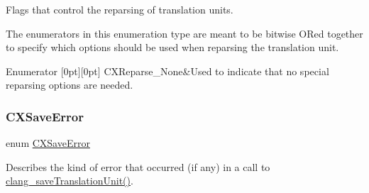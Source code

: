 Flags that control the reparsing of translation units. 

The enumerators in this enumeration type are meant to be bitwise O\+Red together to specify which options should be used when reparsing the translation unit. \begin{DoxyEnumFields}{Enumerator}
[0pt][0pt]{}\mbox{\label{group__CINDEX__TRANSLATION__UNIT_ggabbc92e66e3a3b22de7ead07cf01678b9a72314cac7f41f5087a103175af95e7ce}} 
C\+X\+Reparse\+\_\+\+None&Used to indicate that no special reparsing options are needed. \\
\hline

\end{DoxyEnumFields}
\mbox{\label{group__CINDEX__TRANSLATION__UNIT_ga7016a2cf0a256f239a8887d1251d5c23}} 
\subsubsection{\texorpdfstring{C\+X\+Save\+Error}{CXSaveError}}
{\footnotesize\ttfamily enum \hyperlink{group__CINDEX__TRANSLATION__UNIT_ga7016a2cf0a256f239a8887d1251d5c23}{C\+X\+Save\+Error}}



Describes the kind of error that occurred (if any) in a call to {\ttfamily \hyperlink{group__CINDEX__TRANSLATION__UNIT_ga3abe9df81f9fef269d737d82720c1d33}{clang\+\_\+save\+Translation\+Unit()}}. 

